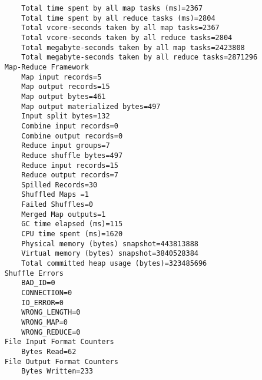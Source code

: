 \begin{lstlisting}
		Total time spent by all map tasks (ms)=2367
		Total time spent by all reduce tasks (ms)=2804
		Total vcore-seconds taken by all map tasks=2367
		Total vcore-seconds taken by all reduce tasks=2804
		Total megabyte-seconds taken by all map tasks=2423808
		Total megabyte-seconds taken by all reduce tasks=2871296
	Map-Reduce Framework
		Map input records=5
		Map output records=15
		Map output bytes=461
		Map output materialized bytes=497
		Input split bytes=132
		Combine input records=0
		Combine output records=0
		Reduce input groups=7
		Reduce shuffle bytes=497
		Reduce input records=15
		Reduce output records=7
		Spilled Records=30
		Shuffled Maps =1
		Failed Shuffles=0
		Merged Map outputs=1
		GC time elapsed (ms)=115
		CPU time spent (ms)=1620
		Physical memory (bytes) snapshot=443813888
		Virtual memory (bytes) snapshot=3840528384
		Total committed heap usage (bytes)=323485696
	Shuffle Errors
		BAD_ID=0
		CONNECTION=0
		IO_ERROR=0
		WRONG_LENGTH=0
		WRONG_MAP=0
		WRONG_REDUCE=0
	File Input Format Counters 
		Bytes Read=62
	File Output Format Counters 
		Bytes Written=233
\end{lstlisting}

